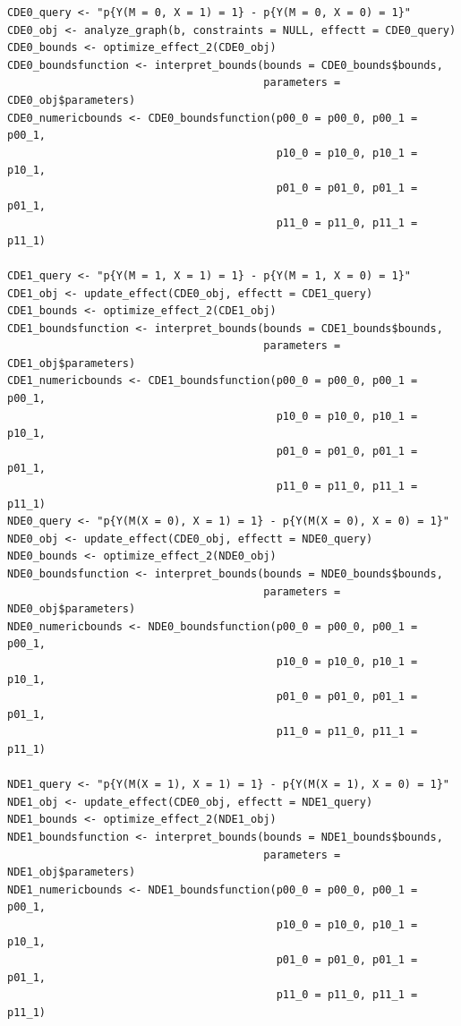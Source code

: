 \begin{verbatim}
CDE0_query <- "p{Y(M = 0, X = 1) = 1} - p{Y(M = 0, X = 0) = 1}"
CDE0_obj <- analyze_graph(b, constraints = NULL, effectt = CDE0_query)
CDE0_bounds <- optimize_effect_2(CDE0_obj)
CDE0_boundsfunction <- interpret_bounds(bounds = CDE0_bounds$bounds, 
                                        parameters = CDE0_obj$parameters)
CDE0_numericbounds <- CDE0_boundsfunction(p00_0 = p00_0, p00_1 = p00_1, 
                                          p10_0 = p10_0, p10_1 = p10_1, 
                                          p01_0 = p01_0, p01_1 = p01_1, 
                                          p11_0 = p11_0, p11_1 = p11_1)

CDE1_query <- "p{Y(M = 1, X = 1) = 1} - p{Y(M = 1, X = 0) = 1}"
CDE1_obj <- update_effect(CDE0_obj, effectt = CDE1_query)
CDE1_bounds <- optimize_effect_2(CDE1_obj)
CDE1_boundsfunction <- interpret_bounds(bounds = CDE1_bounds$bounds, 
                                        parameters = CDE1_obj$parameters)
CDE1_numericbounds <- CDE1_boundsfunction(p00_0 = p00_0, p00_1 = p00_1, 
                                          p10_0 = p10_0, p10_1 = p10_1, 
                                          p01_0 = p01_0, p01_1 = p01_1, 
                                          p11_0 = p11_0, p11_1 = p11_1)
NDE0_query <- "p{Y(M(X = 0), X = 1) = 1} - p{Y(M(X = 0), X = 0) = 1}"
NDE0_obj <- update_effect(CDE0_obj, effectt = NDE0_query)
NDE0_bounds <- optimize_effect_2(NDE0_obj)
NDE0_boundsfunction <- interpret_bounds(bounds = NDE0_bounds$bounds, 
                                        parameters = NDE0_obj$parameters)
NDE0_numericbounds <- NDE0_boundsfunction(p00_0 = p00_0, p00_1 = p00_1, 
                                          p10_0 = p10_0, p10_1 = p10_1, 
                                          p01_0 = p01_0, p01_1 = p01_1, 
                                          p11_0 = p11_0, p11_1 = p11_1)

NDE1_query <- "p{Y(M(X = 1), X = 1) = 1} - p{Y(M(X = 1), X = 0) = 1}"
NDE1_obj <- update_effect(CDE0_obj, effectt = NDE1_query)
NDE1_bounds <- optimize_effect_2(NDE1_obj)
NDE1_boundsfunction <- interpret_bounds(bounds = NDE1_bounds$bounds, 
                                        parameters = NDE1_obj$parameters)
NDE1_numericbounds <- NDE1_boundsfunction(p00_0 = p00_0, p00_1 = p00_1, 
                                          p10_0 = p10_0, p10_1 = p10_1, 
                                          p01_0 = p01_0, p01_1 = p01_1, 
                                          p11_0 = p11_0, p11_1 = p11_1)
\end{verbatim}

